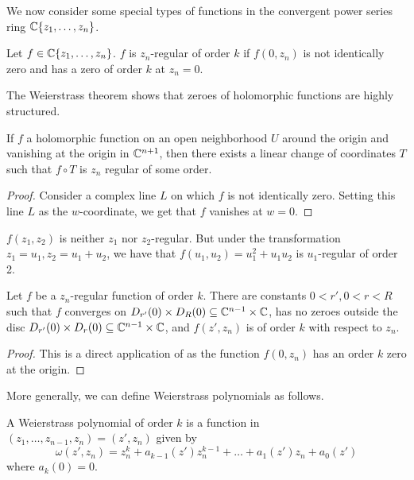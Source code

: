 We now consider some special types of functions in the convergent power series ring $\mathbb{C}\{z_{1},\dots,z_{n}\}$. 
\begin{definition}\label{def: regular of fixed order}
    Let $f\in\mathbb{C}\{z_{1},\dots,z_{n}\}$. $f$ is $z_{n}$-regular of order $k$ if $f(0,z_{n})$ is not identically zero and has a zero of order $k$ at $z_{n}=0$. 
\end{definition}
The Weierstrass theorem shows that zeroes of holomorphic functions are highly structured. 
\begin{lemma}\label{lem: regular transformations}
    If $f$ a holomorphic function on an open neighborhood $U$ around the origin and vanishing at the origin in $\mathbb{C}^{n+1}$, then there exists a linear change of coordinates $T$ such that $f\circ T$ is $z_{n}$ regular of some order.
\end{lemma}
\begin{proof}
    Consider a complex line $L$ on which $f$ is not identically zero. Setting this line $L$ as the $w$-coordinate, we get that $f$ vanishes at $w=0$. 
\end{proof}
\begin{example}
    $f(z_{1},z_{2})$ is neither $z_{1}$ nor $z_{2}$-regular. But under the transformation $z_{1}=u_{1},z_{2}=u_{1}+u_{2}$, we have that $f(u_{1},u_{2})=u_{1}^{2}+u_{1}u_{2}$ is $u_{1}$-regular of order 2. 
\end{example}
\begin{lemma}\label{lem: order k function}
    Let $f$ be a $z_{n}$-regular function of order $k$. There are constants $0<r', 0<r<R$ such that $f$ converges on $D_{r'}(0)\times D_{R}(0)\subseteq\mathbb{C}^{n-1}\times\mathbb{C}$, has no zeroes outside the disc $D_{r'}(0)\times D_{r}(0)\subseteq\mathbb{C}^{n-1}\times\mathbb{C}$, and $f(z',z_{n})$ is of order $k$ with respect to $z_{n}$.
\end{lemma}
\begin{proof}
    This is a direct application of  as the function $f(0,z_{n})$ has an order $k$ zero at the origin. 
\end{proof}
More generally, we can define Weierstrass polynomials as follows. 
\begin{definition}\label{def: Weierstrass polynomials}
    A Weierstrass polynomial of order $k$ is a function in $(z_{1},\dots,z_{n-1},z_{n})=(z',z_{n})$ given by 
    $$\omega(z',z_{n})=z_{n}^{k}+a_{k-1}(z')z_{n}^{k-1}+\dots+a_{1}(z')z_{n}+a_{0}(z')$$
    where $a_{k}(0)=0$. 
\end{definition}
